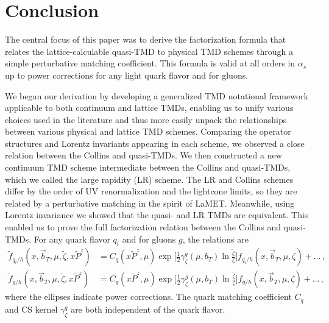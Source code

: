 \documentclass[11pt,a4paper]{article}
\newcommand{\bt}{\vec b_T}
\begin{document}
\section{Conclusion}
\label{sec:conclusion}

The central focus of this paper was to derive the factorization formula  that relates the lattice-calculable quasi-TMD to physical TMD schemes through a simple perturbative matching coefficient.
This formula is valid at all orders in $\alpha_s$ up to power corrections for any light quark flavor and for gluons.

We began our derivation by developing a generalized TMD notational framework applicable to both continuum and lattice TMDs, enabling us to unify various choices used in the literature and thus more easily unpack the relationships between various physical and lattice TMD schemes. 
Comparing the operator structures and Lorentz invariants appearing in each scheme, we observed a close relation between the Collins and quasi-TMDs.
We then constructed a new continuum TMD scheme intermediate between the Collins and quasi-TMDs, which we called the large rapidity (LR) scheme. 
The LR and Collins schemes differ by the order of UV renormalization and the lightcone limits, so they are related by a perturbative matching in the spirit of LaMET. Meanwhile, using Lorentz invariance we showed that the quasi- and LR TMDs are equivalent. This enabled us to prove the full factorization relation between the Collins and quasi-TMDs. For any quark flavor $q_i$ and for gluons $g$, the relations are
\begin{align}
 \tilde f_{q_i/h}(x, \bt, \mu, \tilde\zeta, x\tilde P^z)
 &= C_q(x \tilde P^z,\mu)
    \exp\biggl[ \frac12 \gamma_\zeta^q(\mu, b_T) \ln\frac{\tilde\zeta }{\zeta}\biggr]
    f_{q_i/h}(x, \bt, \mu, \zeta)
 + \ldots\,,\\
  \tilde f_{g/h}(x, \bt, \mu, \tilde\zeta, x\tilde P^z)
 &= C_g(x \tilde P^z,\mu)
    \exp\biggl[ \frac12 \gamma_\zeta^g(\mu, b_T) \ln\frac{\tilde\zeta }{\zeta}\biggr]
    f_{g/h}(x, \bt, \mu, \zeta)
 + \ldots
\,,\end{align}
where the ellipses indicate power corrections.
The quark matching coefficient $C_q$ and CS kernel $\gamma_\zeta^q$ are both independent of the quark flavor.
\end{document}

